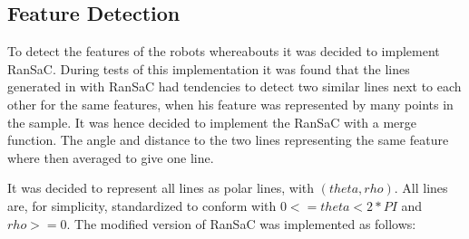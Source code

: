 \subsection{Feature Detection}
To detect the features of the robots whereabouts it was decided to implement RanSaC. During tests of this implementation it was found that the lines generated in with RanSaC had tendencies to detect two similar lines next to each other for the same features, when his feature was represented by many points in the sample. It was hence decided to implement the RanSaC with a merge function. The angle and distance to the two lines representing the same feature where then averaged to give one line.



It was decided to represent all lines as polar lines, with $ (theta, rho) $. All lines are, for simplicity, standardized to conform with $ 0 <= theta < 2*PI $ and $ rho >= 0 $. The modified version of RanSaC was implemented as follows:

